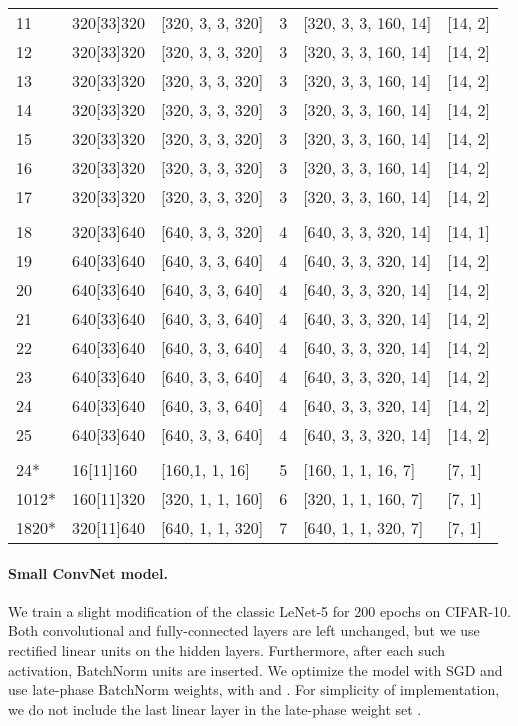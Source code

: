 \documentclass{article} \usepackage{iclr2021_conference,times}
\begin{document}
\begin{table}[htbp!]
{\begin{tabular}{@{}llllll@{}}
11 & 320[33]320 & [320, 3, 3, 320] & 3 & [320, 3, 3, 160, 14] & [14, 2] \\ 
12 & 320[33]320 & [320, 3, 3, 320] & 3 & [320, 3, 3, 160, 14] & [14, 2] \\ 
13 & 320[33]320 & [320, 3, 3, 320] & 3 & [320, 3, 3, 160, 14] & [14, 2] \\ 
14 & 320[33]320 & [320, 3, 3, 320] & 3 & [320, 3, 3, 160, 14] & [14, 2] \\ 
15 & 320[33]320 & [320, 3, 3, 320] & 3 & [320, 3, 3, 160, 14] & [14, 2] \\ 
16 & 320[33]320 & [320, 3, 3, 320] & 3 & [320, 3, 3, 160, 14] & [14, 2] \\ 
17 & 320[33]320 & [320, 3, 3, 320] & 3 & [320, 3, 3, 160, 14] & [14, 2] \\ 
 &  &  &  &  &  \\ 
18 & 320[33]640 & [640, 3, 3, 320] & 4 & [640, 3, 3, 320, 14] & [14, 1] \\ 
19 & 640[33]640 & [640, 3, 3, 640] & 4 & [640, 3, 3, 320, 14] & [14, 2] \\ 
20 & 640[33]640 & [640, 3, 3, 640] & 4 & [640, 3, 3, 320, 14] & [14, 2] \\ 
21 & 640[33]640 & [640, 3, 3, 640] & 4 & [640, 3, 3, 320, 14] & [14, 2] \\ 
22 & 640[33]640 & [640, 3, 3, 640] & 4 & [640, 3, 3, 320, 14] & [14, 2] \\ 
23 & 640[33]640 & [640, 3, 3, 640] & 4 & [640, 3, 3, 320, 14] & [14, 2] \\ 
24 & 640[33]640 & [640, 3, 3, 640] & 4 & [640, 3, 3, 320, 14] & [14, 2] \\ 
25 & 640[33]640 & [640, 3, 3, 640] & 4 & [640, 3, 3, 320, 14] & [14, 2] \\ 
 &  &  &  &  &  \\ 
24* & 16[11]160 & [160,1, 1, 16] & 5 & [160, 1, 1, 16, 7] & [7, 1] \\ 
1012* & 160[11]320 & [320, 1, 1, 160] & 6 & [320, 1, 1, 160, 7] & [7, 1] \\ 
1820* & 320[11]640 & [640, 1, 1, 320] & 7 & [640, 1, 1, 320, 7] & [7, 1] \\
 \midrule
  \end{tabular}}
\end{table}




\paragraph{Small ConvNet model.} We train a slight modification of the classic LeNet-5 \citep{lecun_gradient-based_1998} for 200 epochs on CIFAR-10. Both convolutional and fully-connected layers are left unchanged, but we use rectified linear units on the hidden layers. Furthermore, after each such activation, BatchNorm units are inserted. We optimize the model with SGD and use late-phase BatchNorm weights, with  and . For simplicity of implementation, we do not include the last linear layer in the late-phase weight set .
\end{document}
